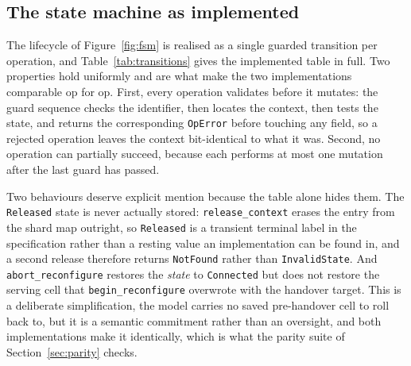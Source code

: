 \documentclass[english,twoside,openright,a4paper,censored,csm,software-track-2020]{HYthesisML}
\begin{document}
\subsection{The state machine as implemented}
The lifecycle of Figure~\ref{fig:fsm} is realised as a single guarded transition per
operation, and Table~\ref{tab:transitions} gives the implemented table in full. Two properties
hold uniformly and are what make the two implementations comparable op for op. First, every
operation validates before it mutates: the guard sequence checks the identifier, then locates
the context, then tests the state, and returns the corresponding \texttt{OpError} before
touching any field, so a rejected operation leaves the context bit-identical to what it was.
Second, no operation can partially succeed, because each performs at most one mutation after
the last guard has passed.

Two behaviours deserve explicit mention because the table alone hides them. The
\texttt{Released} state is never actually stored: \texttt{release\_context} erases the entry
from the shard map outright, so \texttt{Released} is a transient terminal label in the
specification rather than a resting value an implementation can be found in, and a second
release therefore returns \texttt{NotFound} rather than \texttt{InvalidState}.
And \texttt{abort\_reconfigure} restores the \emph{state} to \texttt{Connected} but does not
restore the serving cell that \texttt{begin\_reconfigure} overwrote with the handover target.
This is a deliberate simplification, the model carries no saved pre-handover cell to roll back
to, but it is a semantic commitment rather than an oversight, and both implementations make it
identically, which is what the parity suite of Section~\ref{sec:parity} checks.
\end{document}
